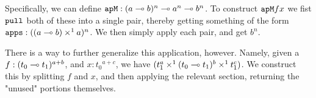 Specifically, we can define $\verb|apM| : (a \proc b)^n \proc a^n \proc b^n$.
To construct $\verb|apM| f x$ we fist $\verb|pull|$ both of these into a single pair, thereby getting something of the form $\verb|apps| : ((a \proc b) \lpair a)^n$. 
We then simply apply each pair, and get $b^n$.

There is a way to further generalize this application, however. 
Namely, given a $f : (t_0 \multimap t_1)^{a+b}$, and $x : {t_0}^{a+c}$, we have $(t_1^a \times^1 (t_0 \multimap t_1)^b \times^1 t_1^c)$.
We construct this by splitting $f$ and $x$, and then applying the relevant section, returning the "unused" portions themselves.